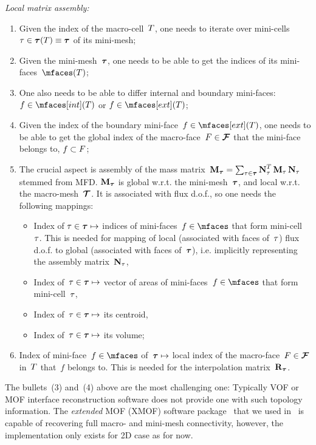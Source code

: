 \textit{Local matrix assembly:}
\begin{enumerate}
	\item Given the index of the macro-cell~$T$, one needs to iterate over mini-cells~$\tau \in {\boldsymbol{\mathbf{\mathcal \tau}}}(T) \equiv {\boldsymbol{\mathbf{\mathcal \tau}}}$ of its mini-mesh;
	\item Given the mini-mesh~${\boldsymbol{\mathbf{\mathcal \tau}}}$, one needs to be able to get the indices of its mini-faces~$\mfaces(\bcell)$;
	\item One also needs to be able to differ internal and boundary mini-faces: $\mface \in \mfaces[int](\bcell)$ or $\mface \in \mfaces[ext](\bcell)$;
	\item Given the index of the boundary mini-face~$\mface \in \mfaces[ext](\bcell)$, one needs to be able to get the global index of the macro-face~$F \in {\boldsymbol{\mathbf{\mathcal F}}_{\text{}}}$ that the mini-face belongs to, $f \subset F$;  
	\item The crucial aspect is assembly of the mass matrix~$\boldsymbol{\mathbf{M}}_{{\boldsymbol{\mathbf{\mathcal \tau}}}} = \sum_{\tau \in {\boldsymbol{\mathbf{\mathcal \tau}}}} \boldsymbol{\mathbf{N}}^T_{\tau}\,\boldsymbol{\mathbf{M}}_{\tau}\,\boldsymbol{\mathbf{N}}_{\tau}$ stemmed from MFD. $\boldsymbol{\mathbf{M}}_{{\boldsymbol{\mathbf{\mathcal \tau}}}}$ is global w.r.t. the mini-mesh~${\boldsymbol{\mathbf{\mathcal \tau}}}$, and local w.r.t. the macro-mesh~${\boldsymbol{\mathbf{\mathcal T}}}$. It is associated with flux d.o.f., so one needs the following mappings:
	\begin{itemize}
		\item Index of $\tau \in {\boldsymbol{\mathbf{\mathcal \tau}}} \mapsto$ indices of mini-faces~$\mface \in \mfaces$ that form mini-cell~$\tau$. This is needed for mapping of local (associated with faces of~$\tau$) flux d.o.f. to global (associated with faces of~${\boldsymbol{\mathbf{\mathcal \tau}}}$), i.e. implicitly representing the assembly matrix~$\boldsymbol{\mathbf{N}}_\tau$,
		\item Index of~$\tau \in {\boldsymbol{\mathbf{\mathcal \tau}}} \mapsto$ vector of areas of mini-faces~$\mface \in \mfaces$ that form mini-cell~$\tau$,
		\item Index of~$\tau \in {\boldsymbol{\mathbf{\mathcal \tau}}} \mapsto$ its centroid,
		\item Index of~$\tau \in {\boldsymbol{\mathbf{\mathcal \tau}}} \mapsto$ its volume;
	\end{itemize} 
	\item Index of mini-face~$f \in \mfaces$ of~${\boldsymbol{\mathbf{\mathcal \tau}}} \mapsto$ local index of the macro-face~$F \in {\boldsymbol{\mathbf{\mathcal F}}_{\text{}}}$ in~$T$ that~$f$ belongs to. This is needed for the interpolation matrix~$\boldsymbol{\mathbf{R}}_{{\boldsymbol{\mathbf{\mathcal \tau}}}}$.
\end{enumerate}

The bullets~(3) and~(4) above are the most challenging one: Typically VOF or MOF interface reconstruction software does not provide one with such topology information. The \textit{extended} MOF (XMOF) software package~\cite{kikinzon2018xmof} that we used in~\cite{kikinzon2017approximate, ZHILIAKOV2019333} is capable of recovering full macro- and mini-mesh connectivity, however, the implementation only exists for 2D case as for now.

